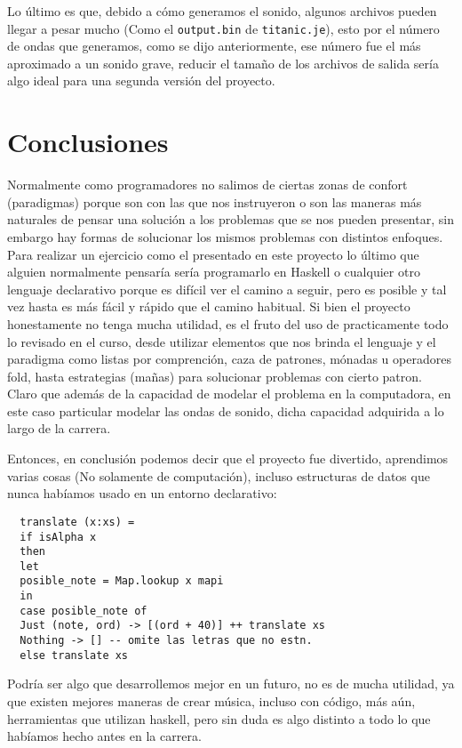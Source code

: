 \documentclass[10pt,a4paper]{article}
\begin{document}
Lo último es que, debido a cómo generamos el sonido, algunos archivos pueden
llegar a pesar mucho (Como el \texttt{output.bin} de \texttt{titanic.je}), esto
por el número de ondas que generamos, como se dijo anteriormente, ese número fue
el más aproximado a un sonido grave, reducir el tamaño de los archivos de salida
sería algo ideal para una segunda versión del proyecto.

\section{Conclusiones}
\noindent Normalmente como programadores no salimos de ciertas zonas de confort
(paradigmas) porque son con las que nos instruyeron o son las maneras más
naturales de pensar una solución a los problemas que se nos pueden presentar, sin
embargo hay formas de solucionar los mismos problemas con distintos enfoques.
Para realizar un ejercicio como el presentado en este proyecto lo último que
alguien normalmente pensaría sería programarlo en Haskell o cualquier otro
lenguaje declarativo porque es difícil ver el camino a seguir, pero es posible y
tal vez hasta es más fácil y rápido que el camino habitual. Si bien el proyecto
honestamente no tenga mucha utilidad, es el fruto del uso de practicamente todo
lo revisado en el curso, desde utilizar elementos que nos brinda el lenguaje y el
paradigma como listas por comprención, caza de patrones, mónadas u operadores
fold, hasta estrategias (mañas) para solucionar problemas con cierto patron.
Claro que además de la capacidad de modelar el problema en la computadora, en
este caso particular modelar las ondas de sonido, dicha capacidad adquirida a lo
largo de la carrera.

Entonces, en conclusión podemos decir que el proyecto fue divertido, aprendimos
varias cosas (No solamente de computación), incluso estructuras de datos que
nunca habíamos usado en un entorno declarativo:

\begin{verbatim}
  translate (x:xs) =
  if isAlpha x
  then
  let
  posible_note = Map.lookup x mapi
  in
  case posible_note of
  Just (note, ord) -> [(ord + 40)] ++ translate xs
  Nothing -> [] -- omite las letras que no estn.
  else translate xs
\end{verbatim}

Podría ser algo que desarrollemos mejor en un futuro, no es de mucha utilidad,
ya que existen mejores maneras de crear música, incluso con código, más aún,
herramientas que utilizan haskell\cite{tidal}, pero sin duda es algo distinto a
todo lo que habíamos hecho antes en la carrera.

 {
  \nocite{paul}
  \nocite{tidal}
}

\end{document}

